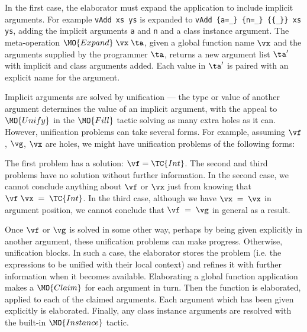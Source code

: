 In the first case, the elaborator must expand the application to include implicit arguments.
For example \texttt{vAdd xs ys} is expanded to
\texttt{vAdd \{a=\_\} \{n=\_\} \{\{\_\}\} xs ys}, adding the implicit arguments
\texttt{a} and \texttt{n} and a class instance argument. The meta-operation
$\MO{Expand}\;\vx\;\ta$, given a global function name $\vx$ and the
arguments supplied by the programmer $\ta$, returns a new argument list
$\ta'$ with implicit and class arguments added. Each value in
$\ta'$ is paired with an explicit name for the argument.

Implicit arguments are solved by unification
--- the type or value of another argument determines the value of an implicit argument,
with the appeal to $\MO{Unify}$ in the $\MO{Fill}$ tactic solving as many extra holes
as it can. However, unification problems can take several forms. For example, assuming
$\vf$, $\vg$, $\vx$ are holes, we might have unification problems of the following
forms:


The first problem has a solution: $\vf=\TC{Int}$. The second and third problems
have no solution without further information. In the second case, we cannot
conclude anything about $\vf$ or $\vx$ just from knowing that
$\vf\;\vx\;=\;\TC{Int}$.  In the third case, although we have $\vx\;=\;\vx$ in
argument position, we cannot conclude that $\vf\;=\;\vg$ in general as a
result.

Once $\vf$ or $\vg$ is solved in some other way, perhaps by being given
explicitly in another argument, these unification problems can make progress.
Otherwise, unification blocks.  In such a case, the elaborator stores the
problem (i.e. the expressions to be unified with their local context) and
refines it with further information when it becomes available. 
Elaborating a global function application makes a $\MO{Claim}$ for each
argument in turn. Then the function is elaborated, applied to each of the
claimed arguments. Each argument which has been given explicitly is
elaborated. 
Finally, any class instance arguments are resolved with the
built-in $\MO{Instance}$ tactic.


